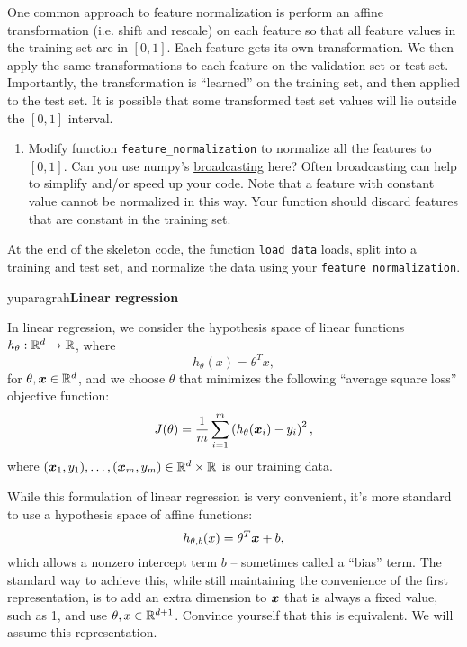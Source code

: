 \documentclass{article}
\begin{document}
One common approach to feature normalization is perform
an affine transformation (i.e. shift and rescale) on each feature
so that all feature values in the training set are in $[0,1]$. Each
feature gets its own transformation. We then apply the same transformations
to each feature on the validation set or test set. Importantly, the transformation is ``learned'' on the
training set, and then applied to the test set. It is possible that
some transformed test set values will lie outside the $[0,1]$ interval.

\begin{enumerate}
\setcounter{enumi}{\value{saveenum}}
    \item Modify function \texttt{feature\_normalization} to normalize all the
features to $[0,1]$. Can you use numpy's \href{https://docs.scipy.org/doc/numpy/user/basics.broadcasting.html}{broadcasting} here? Often broadcasting can help to simplify and/or speed up your code. Note that a feature with constant value cannot be normalized in
this way. Your function should discard features that are constant
in the training set.
\setcounter{saveenum}{\value{enumi}}
\end{enumerate}

At the end of the skeleton code, the function \texttt{load\_data} loads, split into a training and test set, and normalize the data using your \texttt{feature\_normalization}.

yuparagrah{\bf Linear regression}

In linear regression, we consider the hypothesis space of linear functions
$h_{\theta}:\mathbb{R}^{d}\to\mathbb{R}$, where
\[
h_{\theta}(x)=\theta^{T}x,
\]
for $\theta,\boldsymbol{x}\in\mathbb{R}^{d}$, and we choose $\theta$ that minimizes
the following ``average square loss'' objective function: 
\[
J(\theta)=\frac{1}{m}\sum_{i=1}^{m}\left(h_{\theta}(\boldsymbol{x}_{i})-y_{i}\right)^{2},
\]
where $(\boldsymbol{x}_{1},y_{1}),\ldots,(\boldsymbol{x}_{m},y_{m})\in\mathbb{R}^{d}\times\mathbb{R}$
is our training data.

While this formulation of linear regression is very convenient, it's
more standard to use a hypothesis space of affine functions:
\[
h_{\theta,b}(x)=\theta^{T} \boldsymbol{x}+b,
\]
which allows a nonzero intercept term $b$ -- sometimes called a ``bias'' term. The standard
way to achieve this, while still maintaining the convenience of the
first representation, is to add an extra dimension to $\boldsymbol{x}$ that is
always a fixed value, such as 1, and use $\theta,x\in\mathbb{R}^{d+1}$. Convince yourself that
this is equivalent. 
We will assume this representation. 
\end{document}
